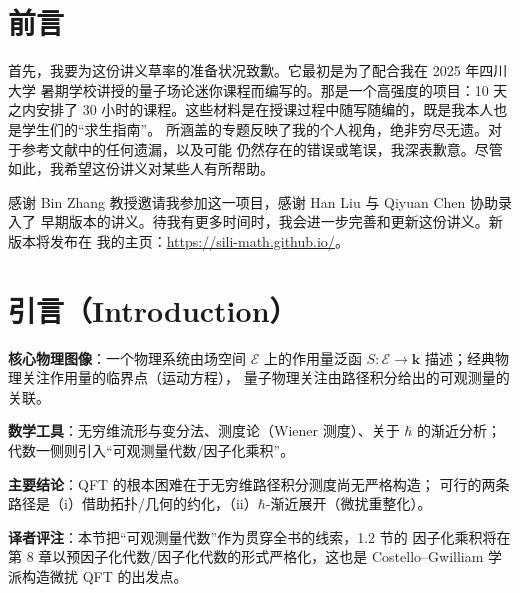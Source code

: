 
\section*{前言}

首先，我要为这份讲义草率的准备状况致歉。它最初是为了配合我在 2025 年四川大学
暑期学校讲授的量子场论迷你课程而编写的。那是一个高强度的项目：10 天之内安排了
30 小时的课程。这些材料是在授课过程中随写随编的，既是我本人也是学生们的“求生指南”。
所涵盖的专题反映了我的个人视角，绝非穷尽无遗。对于参考文献中的任何遗漏，以及可能
仍然存在的错误或笔误，我深表歉意。尽管如此，我希望这份讲义对某些人有所帮助。

感谢 Bin Zhang 教授邀请我参加这一项目，感谢 Han Liu 与 Qiyuan Chen 协助录入了
早期版本的讲义。待我有更多时间时，我会进一步完善和更新这份讲义。新版本将发布在
我的主页：\url{https://sili-math.github.io/}。


\section{引言（Introduction）}

\begin{keypoints}
  \item \textbf{核心物理图像}：一个物理系统由场空间 $\mathcal{E}$ 上的作用量泛函
        $S:\mathcal{E}\to\mathbf{k}$ 描述；经典物理关注作用量的临界点（运动方程），
        量子物理关注由路径积分给出的可观测量的关联。
  \item \textbf{数学工具}：无穷维流形与变分法、测度论（Wiener 测度）、关于 $\hbar$
        的渐近分析；代数一侧则引入“可观测量代数/因子化乘积”。
  \item \textbf{主要结论}：QFT 的根本困难在于无穷维路径积分测度尚无严格构造；
        可行的两条路径是（i）借助拓扑/几何的约化，（ii）$\hbar$-渐近展开（微扰重整化）。
  \item \textbf{译者评注}：本节把“可观测量代数”作为贯穿全书的线索，1.2 节的
        因子化乘积将在第 8 章以预因子化代数/因子化代数的形式严格化，这也是
        Costello--Gwilliam 学派构造微扰 QFT 的出发点。
\end{keypoints}

